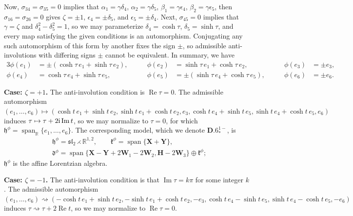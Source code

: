 \documentclass[10pt,a4paper]{amsart}
\DeclareMathOperator{\spanOperator}{span}
\renewcommand{\Im}{\operatorname{Im}}
\renewcommand{\Re}{\operatorname{Re}}
\newcommand{\Span}[1]{\spanOperator\{{#1}\}}
\newcommand{\bbR}{\mathbb{R}}
\newcommand{\mbH}{\mathbf{H}}
\newcommand{\mbW}{\mathbf{W}}
\newcommand{\mbX}{\mathbf{X}}
\newcommand{\mbY}{\mathbf{Y}}
\newcommand{\mfd} {\mathfrak{d}}
\newcommand{\mfh} {\mathfrak{h}}
\newcommand{\mfk} {\mathfrak{k}}
\newcommand{\mfsl} {\mathfrak{sl}}
\numberwithin{equation}{section}
\begin{document}
Now, $\sigma_{34} = \sigma_{35} = 0$ implies that $\alpha_1 = \gamma \delta_4$, $\alpha_2 = \gamma \delta_5$, $\beta_1 = \gamma \epsilon_4$, $\beta_2 = \gamma \epsilon_5$, then $\sigma_{16} = \sigma_{26} = 0$ gives $\zeta = \pm 1$, $\epsilon_4 = \pm \delta_5$, and $\epsilon_5 = \pm \delta_4$. Next, $\sigma_{45} = 0$ implies that $\gamma = \zeta$ and $\delta_4^2 - \delta_5^2 = 1$, so we may parameterize $\delta_4 = \cosh \tau$, $\delta_5 = \sinh \tau$, and every map satisfying the given conditions is an automorphism. Conjugating any such automorphism of this form by another fixes the sign $\pm$, so admissible anti-involutions with differing signs $\pm$ cannot be equivalent. In summary, we have
\begin{alignat*}{3}
	 \phi(e_1) &= \pm (\cosh \tau \, e_1 + \sinh \tau \, e_2) , \qquad
	&\phi(e_2) &= \sinh \tau \, e_1 + \cosh \tau \, e_2 , \qquad
	&\phi(e_3) &= \pm e_3 , \\
	 \phi(e_4) &= \cosh \tau \, e_4 + \sinh \tau \, e_5 , \qquad
	&\phi(e_5) &= \pm (\sinh \tau \, e_4 + \cosh \tau \, e_5) , \qquad
	&\phi(e_6) &= \pm e_6 .
\end{alignat*}

\noindent \textbf{Case: $\zeta = +1$.} The anti-involution condition is $\Re\tau = 0$. The admissible automorphism $(e_1, \ldots, e_6) \!\mapsto\! (\cosh t \, e_1 + \sinh t \, e_2, \sinh t \,e_1 + \cosh t \,e_2, e_3, \cosh t \, e_4 + \sinh t \, e_5, \sinh t \, e_4 + \cosh t \, e_5, e_6)$ induces $\tau \mapsto \tau + 2 {\rm i} \Im t$, so we may normalize to $\tau = 0$, for which $\mfh^{\phi} = \spanOperator_{\bbR}\{e_1, \ldots, e_6\}$. The corresponding model, which we denote $\mathbf{D.6}_{\ast}^{1-}$, is
\begin{equation*}
 \boxed{
 \begin{split}
& \mfh^{\phi} = \mfsl_2 \rightthreetimes \bbR^{1, 2} , \qquad
	 	 \mfk^{\phi} = \Span{\mbX + \mbY} , \\
& \mfd^{\phi} = \Span{\mbX - \mbY + 2 \mbW_1 - 2 \mbW_2, \mbH - 2 \mbW_3} \oplus \mfk^{\phi} ;
 \end{split}
	}
\end{equation*}
$\mfh^{\phi}$ is the affine Lorentzian algebra.

\smallskip
\noindent \textbf{Case: $\zeta = -1$.} The anti-involution condition is that $\Im \tau = k \pi$ for some integer $k$. The admissible automorphism $(e_1, \ldots, e_6) \rightsquigarrow (-\cosh t \, e_1 + \sinh t \, e_2, -\sinh t \, e_1 + \cosh t \, e_2, -e_3, \cosh t \, e_4 - \sinh t \, e_5, \sinh t \, e_4 - \cosh t \, e_5, -e_6 )$ induces $\tau \rightsquigarrow \tau + 2 \Re t$, so we may normalize to $\Re \tau = 0$.
\end{document}
